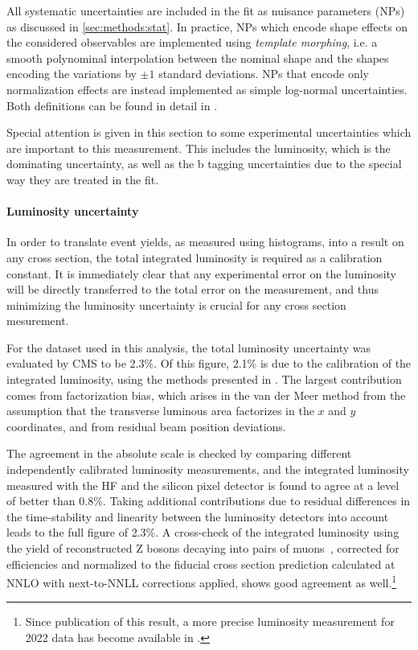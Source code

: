 All systematic uncertainties are included in the fit as nuisance parameters (NPs) as discussed in \cref{sec:methods:stat}. In practice, NPs which encode shape effects on the considered observables are implemented using \textit{template morphing}, i.e. a smooth polynominal interpolation between the nominal shape and the shapes encoding the variations by $\pm 1$ standard deviations. NPs that encode only normalization effects are instead implemented as simple log-normal uncertainties. Both definitions can be found in detail in .

Special attention is given in this section to some experimental uncertainties which are important to this measurement. This includes the luminosity, which is the dominating uncertainty, as well as 
the b tagging uncertainties due to the special way they are treated in the fit.

\paragraph{Luminosity uncertainty}

In order to translate event yields, as measured using histograms, into a result on any cross section, the total integrated luminosity is required as a calibration constant. It is immediately clear that any experimental error on the luminosity will be directly transferred to the total error on the measurement, and thus minimizing the luminosity uncertainty is crucial for any cross section mesurement.

For the dataset used in this analysis, the total luminosity uncertainty was evaluated by CMS to be 2.3\%. Of this figure, 2.1\% is due to the calibration of the integrated luminosity, using the methods presented in . The largest contribution comes from factorization bias, which arises in the van der Meer method from the assumption that the transverse luminous area factorizes in the $x$ and $y$ coordinates, and from residual beam position deviations.

The agreement in the absolute scale is checked by comparing different independently calibrated luminosity measurements, and the integrated luminosity measured with the HF and the silicon pixel detector is found to agree at a level of better than 0.8\%.
Taking additional contributions due to residual differences in the time-stability and linearity between the luminosity detectors into account leads to the full figure of 2.3\%.
A cross-check of the integrated luminosity using the yield of reconstructed Z bosons decaying into pairs of muons~\cite{CMS:DP-2023-003}, corrected for efficiencies and normalized to the fiducial cross section prediction calculated at NNLO with next-to-NNLL corrections applied, shows good agreement as well.\footnote{Since publication of this result, a more precise luminosity measurement for 2022 data has become available in .}

